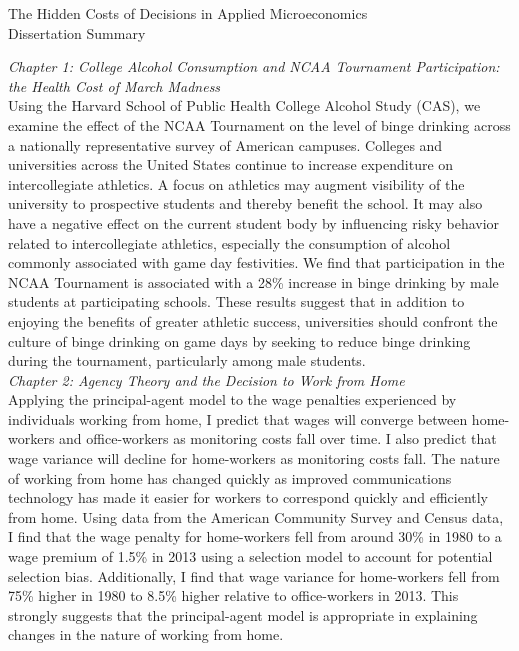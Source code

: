 \vspace{5em}


\begin{adjustwidth}{-5em}{5em}
\begin{large}
\begin{center}

The Hidden Costs of Decisions in Applied Microeconomics \\
Dissertation Summary\\[2em]

\end{center}
\end{large}
\textit{Chapter 1: College Alcohol Consumption and NCAA Tournament Participation: the Health Cost of March Madness}\\

Using the Harvard School of Public Health College Alcohol Study (CAS), we examine the effect of the NCAA Tournament on the level of binge drinking across a nationally representative survey of American campuses. Colleges and universities across the United States continue to increase expenditure on intercollegiate athletics. A focus on athletics may augment visibility of the university to prospective students and thereby benefit the school. It may also have a negative effect on the current student body by influencing risky behavior related to intercollegiate athletics, especially the consumption of alcohol commonly associated with game day festivities. We find that participation in the NCAA Tournament is associated with a 28\% increase in binge drinking by male students at participating schools. These results suggest that in addition to enjoying the benefits of greater athletic success, universities should confront the culture of binge drinking on game days by seeking to reduce binge drinking during the tournament, particularly among male students.\\

\textit{Chapter 2: Agency Theory and the Decision to Work from Home}\\

Applying the principal-agent model to the wage penalties experienced by individuals working from home, I predict that wages will converge between home-workers and office-workers as monitoring costs fall over time. I also predict that wage variance will decline for home-workers as monitoring costs fall. The nature of working from home has changed quickly as improved communications technology has made it easier for workers to correspond quickly and efficiently from home. Using data from the American Community Survey and Census data, I find that the wage penalty for home-workers fell from around 30\% in 1980 to a wage premium of 1.5\% in 2013 using a selection model to account for potential selection bias. Additionally, I find that wage variance for home-workers fell from 75\% higher in 1980 to 8.5\% higher relative to office-workers in 2013. This strongly suggests that the principal-agent model is appropriate in explaining changes in the nature of working from home.\\[3em]


\end{adjustwidth}
